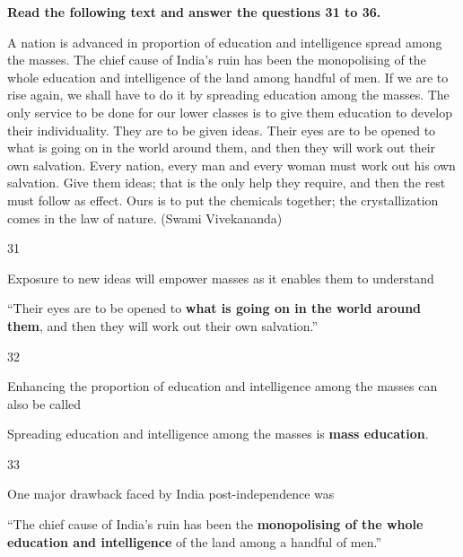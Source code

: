 \begin{context}
\textbf{Read the following text and answer the questions 31 to 36.}\par\smallskip
A nation is advanced in proportion of education and intelligence spread among the masses. The chief cause of India's ruin has been the monopolising of the whole education and intelligence of the land among handful of men. If we are to rise again, we shall have to do it by spreading education among the masses. The only service to be done for our lower classes is to give them education to develop their individuality. They are to be given ideas. Their eyes are to be opened to what is going on in the world around them, and then they will work out their own salvation. Every nation, every man and every woman must work out his own salvation. Give them ideas; that is the only help they require, and then the rest must follow as effect. Ours is to put the chemicals together; the crystallization comes in the law of nature. \hfill (Swami Vivekananda)
\end{context}
\begin{question}{31}
{Exposure to new ideas will empower masses as it enables them to understand\par}
\begin{explain}
``Their eyes are to be opened to \textbf{what is going on in the world around them}, and then they will work out their own salvation.''
\end{explain}
\end{question}

\begin{question}{32}
{Enhancing the proportion of education and intelligence among the masses can also be called\par}
\begin{explain}
Spreading education and intelligence among the masses is \textbf{mass education}.
\end{explain}
\end{question}

\begin{question}{33}
{One major drawback faced by India post-independence was\par}
\begin{explain}
``The chief cause of India's ruin has been the \textbf{monopolising of the whole education and intelligence} of the land among a handful of men.''
\end{explain}
\end{question}

